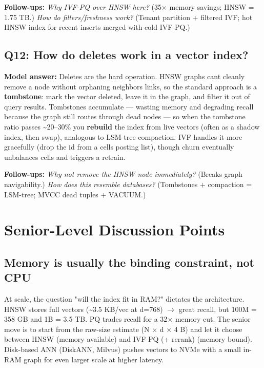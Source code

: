 \documentclass[11pt]{article}
\begin{document}
\textbf{Follow-ups:} \emph{Why IVF-PQ over HNSW here?} (35\(\times\) memory savings; HNSW = 1.75 TB.) \emph{How do filters/freshness work?} (Tenant partition + filtered IVF; hot HNSW index for recent inserts merged with cold IVF-PQ.)

\subsection{Q12: How do deletes work in a vector index?}\label{q12-how-do-deletes-work-in-a-vector-index}

\textbf{Model answer:} Deletes are the hard operation. HNSW graphs can\textquotesingle t cleanly remove a node without orphaning neighbors\textquotesingle{} links, so the standard approach is a \textbf{tombstone}: mark the vector deleted, leave it in the graph, and filter it out of query results. Tombstones accumulate --- wasting memory and degrading recall because the graph still routes through dead nodes --- so when the tombstone ratio passes \textasciitilde20--30\% you \textbf{rebuild} the index from live vectors (often as a shadow index, then swap), analogous to LSM-tree compaction. IVF handles it more gracefully (drop the id from a cell\textquotesingle s posting list), though churn eventually unbalances cells and triggers a retrain.

\textbf{Follow-ups:} \emph{Why not remove the HNSW node immediately?} (Breaks graph navigability.) \emph{How does this resemble databases?} (Tombstones + compaction = LSM-tree; MVCC dead tuples + VACUUM.)

\section{Senior-Level Discussion Points}\label{senior-level-discussion-points}

\subsection{Memory is usually the binding constraint, not CPU}\label{memory-is-usually-the-binding-constraint-not-cpu}

At scale, the question "will the index fit in RAM?" dictates the architecture. HNSW stores full vectors (\textasciitilde3.5 KB/vec at d=768) \(\rightarrow\) great recall, but 100M = 358 GB and 1B = 3.5 TB. PQ trades recall for a 32\(\times\) memory cut. The senior move is to start from the raw-size estimate (N \(\times\) d \(\times\) 4 B) and let it choose between HNSW (memory available) and IVF-PQ (+ rerank) (memory bound). Disk-based ANN (DiskANN, Milvus) pushes vectors to NVMe with a small in-RAM graph for even larger scale at higher latency.
\end{document}

